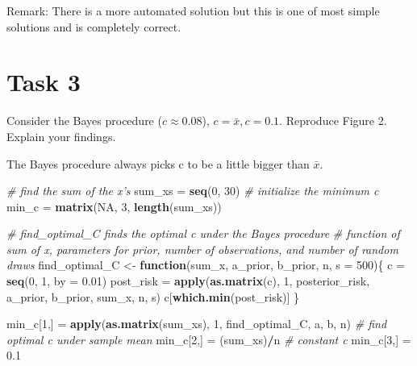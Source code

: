 \documentclass[
]{article}
\newenvironment{Shaded}{\begin{snugshade}}{\end{snugshade}}
\newcommand{\CommentTok}[1]{\textcolor[rgb]{0.56,0.35,0.01}{\textit{#1}}}
\newcommand{\ControlFlowTok}[1]{\textcolor[rgb]{0.13,0.29,0.53}{\textbf{#1}}}
\newcommand{\DataTypeTok}[1]{\textcolor[rgb]{0.13,0.29,0.53}{#1}}
\newcommand{\DecValTok}[1]{\textcolor[rgb]{0.00,0.00,0.81}{#1}}
\newcommand{\FloatTok}[1]{\textcolor[rgb]{0.00,0.00,0.81}{#1}}
\newcommand{\KeywordTok}[1]{\textcolor[rgb]{0.13,0.29,0.53}{\textbf{#1}}}
\newcommand{\NormalTok}[1]{#1}
\newcommand{\OperatorTok}[1]{\textcolor[rgb]{0.81,0.36,0.00}{\textbf{#1}}}
\newcommand{\OtherTok}[1]{\textcolor[rgb]{0.56,0.35,0.01}{#1}}
\newcommand{\StringTok}[1]{\textcolor[rgb]{0.31,0.60,0.02}{#1}}
\begin{document}
Remark: There is a more automated solution but this is one of most
simple solutions and is completely correct.

\hypertarget{task-3}{%
\section{Task 3}\label{task-3}}

Consider the Bayes procedure (\(c\approx 0.08\)), \(c=\bar{x}, c=0.1.\)
Reproduce Figure 2. Explain your findings.

The Bayes procedure always picks c to be a little bigger than
\(\bar{x}\).

\begin{Shaded}
\begin{Highlighting}[]
\CommentTok{# find the sum of the x's}
\NormalTok{sum_xs =}\StringTok{ }\KeywordTok{seq}\NormalTok{(}\DecValTok{0}\NormalTok{, }\DecValTok{30}\NormalTok{)}
\CommentTok{# initialize the minimum c}
\NormalTok{min_c =}\StringTok{ }\KeywordTok{matrix}\NormalTok{(}\OtherTok{NA}\NormalTok{, }\DecValTok{3}\NormalTok{, }\KeywordTok{length}\NormalTok{(sum_xs))}

\CommentTok{# find_optimal_C finds the optimal c under the Bayes procedure}
\CommentTok{# function of sum of x, parameters for prior, number of observations, and number of random draws }
\NormalTok{find_optimal_C <-}\StringTok{ }\ControlFlowTok{function}\NormalTok{(sum_x, a_prior, b_prior, n, }\DataTypeTok{s =} \DecValTok{500}\NormalTok{)\{}
\NormalTok{  c =}\StringTok{ }\KeywordTok{seq}\NormalTok{(}\DecValTok{0}\NormalTok{, }\DecValTok{1}\NormalTok{, }\DataTypeTok{by =} \FloatTok{0.01}\NormalTok{)}
\NormalTok{  post_risk =}\StringTok{  }\KeywordTok{apply}\NormalTok{(}\KeywordTok{as.matrix}\NormalTok{(c), }\DecValTok{1}\NormalTok{, posterior_risk, a_prior, b_prior, sum_x, n, s)}
\NormalTok{  c[}\KeywordTok{which.min}\NormalTok{(post_risk)]}
\NormalTok{\}}

\NormalTok{min_c[}\DecValTok{1}\NormalTok{,] =}\StringTok{ }\KeywordTok{apply}\NormalTok{(}\KeywordTok{as.matrix}\NormalTok{(sum_xs), }\DecValTok{1}\NormalTok{, find_optimal_C, a, b, n)}
\CommentTok{# find optimal c under sample mean}
\NormalTok{min_c[}\DecValTok{2}\NormalTok{,] =}\StringTok{ }\NormalTok{(sum_xs)}\OperatorTok{/}\NormalTok{n}
\CommentTok{# constant c }
\NormalTok{min_c[}\DecValTok{3}\NormalTok{,] =}\StringTok{ }\FloatTok{0.1}


\end{Highlighting}
\end{Shaded}
\end{document}
